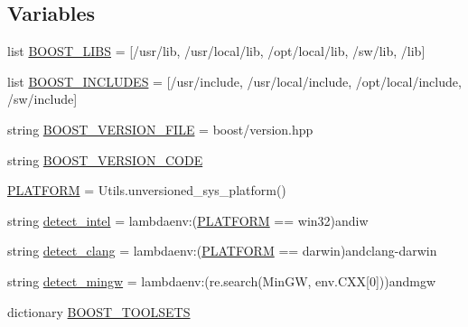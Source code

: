\subsection*{Variables}
\begin{DoxyCompactItemize}
\item 
list \hyperlink{namespaceboost_a6f024f093b10ce8e7c196238c31e6005}{B\+O\+O\+S\+T\+\_\+\+L\+I\+BS} = \mbox{[}\textquotesingle{}/usr/lib\textquotesingle{}, \textquotesingle{}/usr/local/lib\textquotesingle{}, \textquotesingle{}/opt/local/lib\textquotesingle{}, \textquotesingle{}/sw/lib\textquotesingle{}, \textquotesingle{}/lib\textquotesingle{}\mbox{]}
\item 
list \hyperlink{namespaceboost_a26f05aa292f6e2e6c1573db673de53aa}{B\+O\+O\+S\+T\+\_\+\+I\+N\+C\+L\+U\+D\+ES} = \mbox{[}\textquotesingle{}/usr/include\textquotesingle{}, \textquotesingle{}/usr/local/include\textquotesingle{}, \textquotesingle{}/opt/local/include\textquotesingle{}, \textquotesingle{}/sw/include\textquotesingle{}\mbox{]}
\item 
string \hyperlink{namespaceboost_a61f5392dfc447d8c86202ae86a5d5f71}{B\+O\+O\+S\+T\+\_\+\+V\+E\+R\+S\+I\+O\+N\+\_\+\+F\+I\+LE} = \textquotesingle{}boost/version.\+hpp\textquotesingle{}
\item 
string \hyperlink{namespaceboost_a3f4351660d1637a10003c2ae5e2991a5}{B\+O\+O\+S\+T\+\_\+\+V\+E\+R\+S\+I\+O\+N\+\_\+\+C\+O\+DE}
\item 
\hyperlink{namespaceboost_a62c954028d3e79409e93dfeae1d32ecb}{P\+L\+A\+T\+F\+O\+RM} = Utils.\+unversioned\+\_\+sys\+\_\+platform()
\item 
string \hyperlink{namespaceboost_a3c273cf1e2a95daceae623bf06c266c0}{detect\+\_\+intel} = lambdaenv\+:(\hyperlink{namespaceboost_a62c954028d3e79409e93dfeae1d32ecb}{P\+L\+A\+T\+F\+O\+RM} == \textquotesingle{}win32\textquotesingle{})and\textquotesingle{}iw\textquotesingle{}
\item 
string \hyperlink{namespaceboost_a0cbe1180b26a0dafbf7ed633cc06805d}{detect\+\_\+clang} = lambdaenv\+:(\hyperlink{namespaceboost_a62c954028d3e79409e93dfeae1d32ecb}{P\+L\+A\+T\+F\+O\+RM} == \textquotesingle{}darwin\textquotesingle{})and\textquotesingle{}clang-\/darwin\textquotesingle{}
\item 
string \hyperlink{namespaceboost_ab9cba3cb197b1cb5ed3dee4ce6f3bc69}{detect\+\_\+mingw} = lambdaenv\+:(re.\+search(\textquotesingle{}Min\+GW\textquotesingle{}, env.\+C\+XX\mbox{[}0\mbox{]}))and\textquotesingle{}mgw\textquotesingle{}
\item 
dictionary \hyperlink{namespaceboost_a558a385fcd527bf8583ab3c559196f64}{B\+O\+O\+S\+T\+\_\+\+T\+O\+O\+L\+S\+E\+TS}
\end{DoxyCompactItemize}


